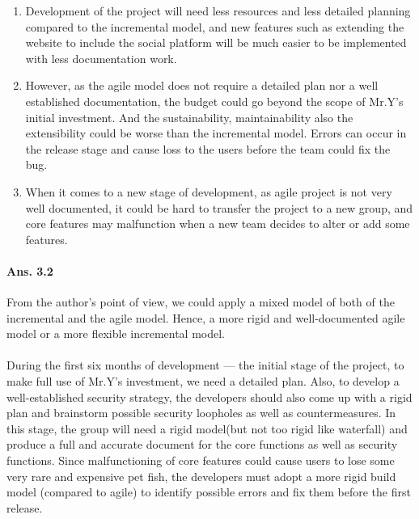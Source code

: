 \documentclass[paper=a4, fontsize=11pt]{scrartcl} %
\numberwithin{equation}{section} %
\numberwithin{figure}{section} %
\numberwithin{table}{section} %
\begin{document}
\begin{itemize}
\begin{enumerate}
		\item Development of the project will need less resources and less detailed planning compared to the incremental model, and new features such as extending the website to include the social platform will be much easier to be implemented with less documentation work.
		\item However, as the agile model does not require a detailed plan nor a well established documentation, the budget could go beyond the scope of Mr.Y's initial investment. And the sustainability, maintainability also the extensibility\cite{agilemodel} could be worse than the incremental model. Errors can occur in the release stage and cause loss to the users before the team could fix the bug.
		\item When it comes to a new stage of development, as agile project is not very well documented, it could be hard to transfer the project to a new group, and core features may malfunction when a new team decides to alter or add some features.
	\end{enumerate}
\end{itemize}
\paragraph{Ans. 3.2}From the author's point of view, we could apply a mixed model of both of the incremental and the agile model. Hence, a more rigid and well-documented agile model or a more flexible incremental model.

\paragraph{} During the first six months of development --- the initial stage of the project, to make full use of Mr.Y's investment, we need a detailed plan. Also, to develop a well-established security strategy, the developers should also come up with a rigid plan and brainstorm possible security loopholes as well as countermeasures. In this stage, the group will need a rigid model(but not too rigid like waterfall) and produce a full and accurate document for the core functions as well as security functions. Since malfunctioning of core features could cause users to lose some very rare and expensive pet fish, the developers must adopt a more rigid build model (compared to agile) to identify possible errors and fix them before the first release.
\end{document}
